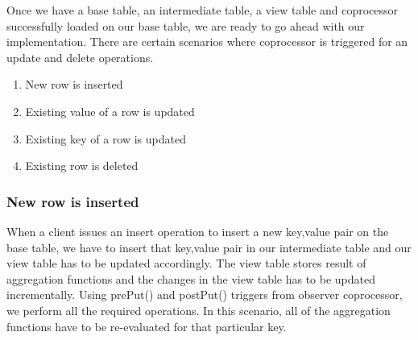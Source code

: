 \documentclass[11pt,a4paper,bibtotoc,idxtotoc,headsepline,footsepline,footexclude,BCOR12mm,DIV13]{scrbook}
\begin{document}


    

Once we have a base table, an intermediate table, a view table and coprocessor successfully loaded on our base table, we are ready to go ahead with our implementation. There are certain scenarios where coprocessor is triggered for an update and delete operations.

\begin{enumerate}
    \item New row is inserted
    \item Existing value of a row is updated
    \item Existing key of a row is updated
    \item Existing row is deleted
\end{enumerate}

\subsubsection{New row is inserted}
\label{Aggr: New Row Inserted}
When a client issues an insert operation to insert a new key,value pair on the base table, we have to insert that key,value pair in our intermediate table and our view table has to be updated accordingly. The view table stores result of aggregation functions and the changes in the view table has to be updated incrementally. Using prePut() and postPut() triggers from observer coprocessor, we perform all the required operations. In this scenario, all of the aggregation functions have to be re-evaluated for that particular key.
\end{document}
